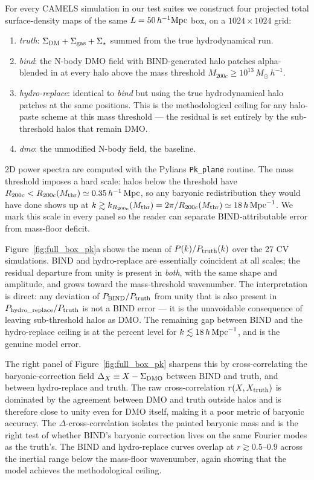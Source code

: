 \documentclass[linenumbers,trackchanges, twocolumn]{aastex701}
\begin{document}
For every CAMELS simulation in our test suites we construct four projected total surface-density maps of the same $L=50\,h^{-1}{\rm Mpc}$ box, on a $1024\times 1024$ grid:
\begin{enumerate}
\item \emph{truth}: $\Sigma_{\rm DM}+\Sigma_{\rm gas}+\Sigma_\star$ summed from the true hydrodynamical run.
\item \emph{bind}: the N-body DMO field with \textsc{BIND}-generated halo patches alpha-blended in at every halo above the mass threshold $M_{200c}\geq 10^{13}\,M_\odot\,h^{-1}$.
\item \emph{hydro-replace}: identical to \emph{bind} but using the true hydrodynamical halo patches at the same positions. This is the methodological ceiling for any halo-paste scheme at this mass threshold --- the residual is set entirely by the sub-threshold halos that remain DMO.
\item \emph{dmo}: the unmodified N-body field, the baseline.
\end{enumerate}
2D power spectra are computed with the Pylians \texttt{Pk\_plane} routine. The mass threshold imposes a hard scale: halos below the threshold have $R_{200c} < R_{200c}(M_{\rm thr})\simeq 0.35\,h^{-1}\,{\rm Mpc}$, so any baryonic redistribution they would have done shows up at $k\gtrsim k_{R_{200c}}(M_{\rm thr}) = 2\pi/R_{200c}(M_{\rm thr})\simeq 18\,h\,{\rm Mpc}^{-1}$. We mark this scale in every panel so the reader can separate \textsc{BIND}-attributable error from mass-floor deficit.

Figure~\ref{fig:full_box_pk}a shows the mean of $P(k)/P_{\rm truth}(k)$ over the 27 CV simulations. \textsc{BIND} and hydro-replace are essentially coincident at all scales; the residual departure from unity is present in \emph{both}, with the same shape and amplitude, and grows toward the mass-threshold wavenumber. The interpretation is direct: any deviation of $P_{\rm BIND}/P_{\rm truth}$ from unity that is also present in $P_{\rm hydro\_replace}/P_{\rm truth}$ is not a \textsc{BIND} error --- it is the unavoidable consequence of leaving sub-threshold halos as DMO. The remaining gap between BIND and the hydro-replace ceiling is at the percent level for $k\lesssim 18\,h\,{\rm Mpc}^{-1}$, and is the genuine model error.

The right panel of Figure~\ref{fig:full_box_pk} sharpens this by cross-correlating the baryonic-correction field $\Delta_X \equiv X - \Sigma_{\rm DMO}$ between \textsc{BIND} and truth, and between hydro-replace and truth. The raw cross-correlation $r(X,X_{\rm truth})$ is dominated by the agreement between DMO and truth outside halos and is therefore close to unity even for DMO itself, making it a poor metric of baryonic accuracy. The $\Delta$-cross-correlation isolates the painted baryonic mass and is the right test of whether \textsc{BIND}'s baryonic correction lives on the same Fourier modes as the truth's. The \textsc{BIND} and hydro-replace curves overlap at $r\gtrsim 0.5$--$0.9$ across the inertial range below the mass-floor wavenumber, again showing that the model achieves the methodological ceiling.
\end{document}
